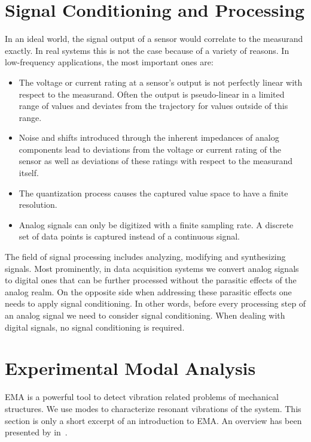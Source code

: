\section{Signal Conditioning and Processing\label{signal_conditioning_processing}}
In an ideal world, the signal output of a sensor would correlate to the measurand exactly. In real systems this is not the case because of a variety of reasons. In low-frequency applications, the most important ones are:

\begin{itemize}
  \item The voltage or current rating at a sensor's output is not perfectly linear with respect to the measurand. Often the output is pseudo-linear in a limited range of values and deviates from the trajectory for values outside of this range.
  \item Noise and shifts introduced through the inherent impedances of analog components lead to deviations from the voltage or current rating of the sensor as well as deviations of these ratings with respect to the measurand itself.
  \item The quantization process causes the captured value space to have a finite resolution.
  \item Analog signals can only be digitized with a finite sampling rate. A discrete set of data points is captured instead of a continuous signal.
\end{itemize}

The field of signal processing includes analyzing, modifying and synthesizing signals. Most prominently, in data acquisition systems we convert analog signals to digital ones that can be further processed without the parasitic effects of the analog realm. On the opposite side when addressing these parasitic effects one needs to apply signal conditioning. In other words, before every processing step of an analog signal we need to consider signal conditioning. When dealing with digital signals, no signal conditioning is required.

\section{Experimental Modal Analysis}

\ac{EMA} is a powerful tool to detect vibration related problems of mechanical structures. We use modes to characterize resonant vibrations of the system. This section is only a short excerpt of an introduction to \ac{EMA}. An overview has been presented by \citeauthor{schwarz1999experimental} in~\cite{schwarz1999experimental}.

